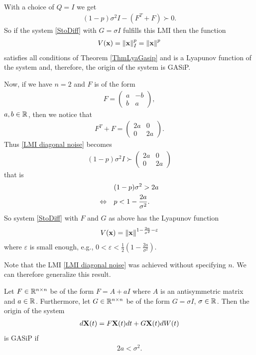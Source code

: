 \documentclass[a4paper,12pt,twoside,BCOR=10mm]{scrbook}
\begin{document}
With a choice of $Q = I$ we get
\begin{align}\label{LMI diagonal noise}
    (1 - p)\sigma^2 I - (F^T + F) \succ 0.
\end{align}
So if the system \eqref{StoDiff} with $G = \sigma I$ fulfills this LMI then the function
\begin{align*}
    V(\mathbf{x}) = \left\lVert\mathbf{x}\right\rVert_{I}^{p} = \left\lVert\mathbf{x}\right\rVert^p 
\end{align*}
satisfies all conditions of Theorem \ref{ThmLyaGasip} and is a Lyapunov function of the system and, therefore, the origin of the system is GASiP.

Now, if we have $n = 2$ and $F$ is of the form
\begin{align*}
    F =
    \begin{pmatrix}
    a & -b\\
    b & a
    \end{pmatrix},
\end{align*}
$a,b \in \mathbb{R}^{}$, then we notice that
\begin{align*}
    F^T + F =
    \begin{pmatrix}
    2a & 0\\
    0 & 2a
    \end{pmatrix}.
\end{align*}
Thus \eqref{LMI diagonal noise} becomes
\begin{align*}
    (1 - p)\sigma^2 I \succ 
    \begin{pmatrix}
    2a & 0\\
    0 & 2a
    \end{pmatrix}
\end{align*}
that is
\begin{align*}
    &(1 - p)\sigma^2 > 2a\\
    \Leftrightarrow \quad& p < 1 - \frac{2a}{\sigma^2}.
\end{align*}
So system \eqref{StoDiff} with $F$ and $G$ as above has the Lyapunov function
\begin{align*}
    V(\mathbf{x}) = \left\lVert\mathbf{x}\right\rVert^{1 - \frac{2a}{\sigma^2} - \varepsilon}
\end{align*}
where $\varepsilon$ is small enough, e.g., $0 < \varepsilon < \frac{1}{2}\left(1 - \frac{2a}{\sigma^2}\right)$.

Note that the LMI \eqref{LMI diagonal noise} was achieved without specifying $n$. We can therefore generalize this result.
\begin{theorem}\label{ThmLyapunovFunc sI Fas n2 U1}
Let $F\in\mathbb{R}^{n\times n}$ be of the form $F = A + aI$ where $A$ is an antisymmetric matrix and $a \in \mathbb{R}^{}$. Furthermore, let $G \in \mathbb{R}^{n \times n}$ be of the form $G = \sigma I$, $\sigma\in \mathbb{R}^{}$. Then the origin of the system
\begin{align*}
    d\mathbf{X}(t) = F\mathbf{X}(t)dt + G\mathbf{X}(t)dW(t)
\end{align*}
is GASiP if
\begin{align*}
2a < \sigma^2.
\end{align*}
\end{theorem}
\end{document}

